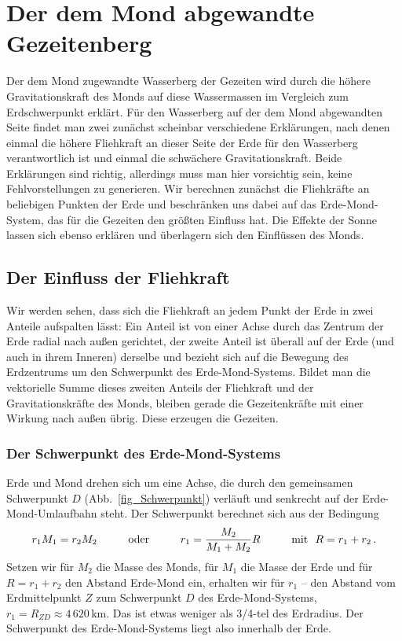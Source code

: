 \section{Der dem Mond abgewandte Gezeitenberg}

Der dem Mond zugewandte Wasserberg der Gezeiten wird durch die h\"ohere Gravitationskraft 
des Monds auf diese Wassermassen im Vergleich zum Erdschwerpunkt erkl\"art.
F\"ur den Wasserberg auf der dem Mond abgewandten Seite findet man zwei zun\"achst scheinbar 
verschiedene Erkl\"arungen, nach denen einmal die h\"ohere Fliehkraft an dieser Seite der Erde f\"ur den
Wasserberg verantwortlich ist und einmal die schw\"achere Gravitationskraft. Beide Erkl\"arungen sind
richtig, allerdings muss man hier vorsichtig sein, keine Fehlvorstellungen zu generieren.
Wir berechnen zun\"achst die Fliehkr\"afte an beliebigen Punkten der Erde und 
beschr\"anken uns dabei auf das Erde-Mond-System, das f\"ur die Gezeiten den gr\"o\ss ten
Einfluss hat. Die Effekte der Sonne lassen sich ebenso erkl\"aren und \"uberlagern sich den
Einfl\"ussen des Monds.

\subsection{Der Einfluss der Fliehkraft}

Wir werden sehen, dass sich die Fliehkraft an jedem Punkt der Erde in zwei Anteile aufspalten
l\"asst: Ein Anteil ist von einer Achse durch das Zentrum der Erde radial nach au\ss en gerichtet, der
zweite Anteil ist \"uberall auf der Erde (und auch in ihrem Inneren) derselbe und bezieht sich
auf die Bewegung des Erdzentrums um den Schwerpunkt des Erde-Mond-Systems. Bildet man die
vektorielle Summe dieses zweiten Anteils der Fliehkraft und der Gravitationskr\"afte des Monds, bleiben
gerade die Gezeitenkr\"afte mit einer Wirkung nach au\ss en \"ubrig. Diese erzeugen die Gezeiten.

\subsubsection{Der Schwerpunkt des Erde-Mond-Systems}

Erde und Mond drehen sich um eine Achse, die durch den gemeinsamen Schwerpunkt $D$
(Abb.\ \ref{fig_Schwerpunkt})
verl\"auft und senkrecht auf der Erde-Mond-Umlaufbahn steht. Der Schwerpunkt berechnet sich aus
der Bedingung
\begin{equation}
\label{eq_Schwerpunkt}
             r_1 M_1 = r_2 M_2  \hspace{1cm} {\rm oder} \hspace{1cm}  
                 r_1  = \frac{M_2}{M_1+M_2} R  \hspace{1cm} {\rm mit} ~~ R=r_1+r_2 \, .
\end{equation}
Setzen wir f\"ur $M_2$ die Masse des Monds, f\"ur $M_1$ die Masse der Erde und f\"ur
$R=r_1+r_2$ den Abstand Erde-Mond ein, erhalten wir f\"ur $r_1$ -- den Abstand vom Erdmittelpunkt $Z$
zum Schwerpunkt $D$ des Erde-Mond-Systems, $r_1 = R_{ZD} \approx 4\,620$\,km. Das ist etwas weniger als
3/4-tel des Erdradius. Der Schwerpunkt des Erde-Mond-Systems liegt also innerhalb der Erde.   

